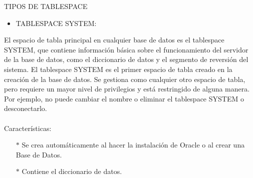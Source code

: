 \newpage

TIPOS DE TABLESPACE
\\
\begin{itemize}
	\item TABLESPACE SYSTEM:
\end{itemize}
\begin{adjustwidth}{0.40in}{0.0in}
	El espacio de tabla principal en cualquier base de datos es el tablespace SYSTEM, que contiene información básica sobre el funcionamiento del servidor de la base de datos, como el diccionario de datos y el segmento de reversión del sistema. El tablespace SYSTEM es el primer espacio de tabla creado en la creación de la base de datos. Se gestiona como cualquier otro espacio de tabla, pero requiere un mayor nivel de privilegios y está restringido de alguna manera. Por ejemplo, no puede cambiar el nombre o eliminar el tablespace SYSTEM o desconectarlo.	\\ \\
	Características:
	\begin{itemize}
		\item[$*$] Se crea automáticamente al hacer la instalación de Oracle o al crear una Base de Datos.
		\item[$*$] Contiene el diccionario de datos.\\
	\end{itemize}		
\end{adjustwidth}


